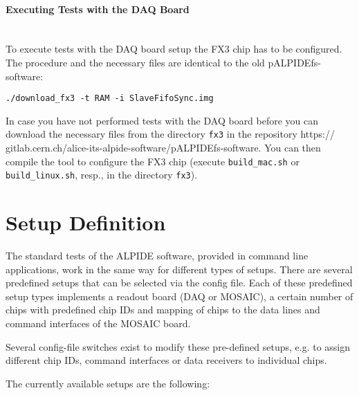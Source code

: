 \documentclass{article}
\begin{document}
\paragraph{Executing Tests with the DAQ Board}\hfill \\
To execute tests with the DAQ board setup the FX3 chip has to be configured. The procedure and the necessary files are identical to the old pALPIDEfs-software:
\begin{verbatim}
./download_fx3 -t RAM -i SlaveFifoSync.img
\end{verbatim}

In case you have not performed tests with the DAQ board before you can download the necessary files from the directory \texttt{fx3} in the repository https:// gitlab.cern.ch/alice-its-alpide-software/pALPIDEfs-software. You can then compile the tool to configure the FX3 chip (execute \texttt{build\_mac.sh} or \texttt{build\_linux.sh}, resp., in the directory \texttt{fx3}).


\section{Setup Definition}

The standard tests of the ALPIDE software, provided in command line applications, work in the same way for different types of setups. There are several predefined setups that can be selected via the config file. Each of these predefined setup types implements a readout board (DAQ or MOSAIC), a certain number of chips with predefined chip IDs and mapping of chips to the data lines and command interfaces of the MOSAIC board.

Several config-file switches exist to modify these pre-defined setups, e.g. to assign different chip IDs, command interfaces or data receivers to individual chips.

The currently available setups are the following:
\end{document}
